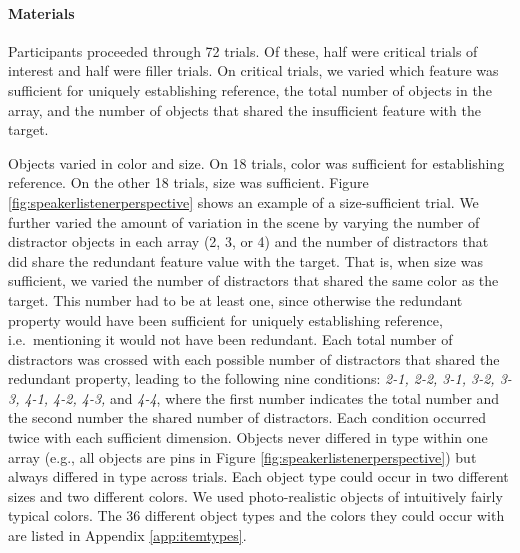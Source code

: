 \documentclass[11pt]{article}
\newcommand{\figref}[1]{Figure \ref{#1}}
\newcommand{\appref}[1]{Appendix \ref{#1}}
\begin{document}



\paragraph{Materials}

Participants proceeded through 72 trials. Of these, half were critical trials of interest and half were filler trials. On critical trials, we varied which feature was sufficient for uniquely establishing reference, the total number of objects in the array, and  the number of objects that shared the insufficient feature with the target. 

Objects varied in color and size. On 18 trials, color was sufficient for establishing reference. On the other 18 trials, size was sufficient. \figref{fig:speakerlistenerperspective} shows an example of a size-sufficient trial. We further varied the amount of variation in the scene by varying the number of distractor objects in each array (2, 3, or  4) and the number of distractors that did share the redundant feature value with the target. That is, when size was sufficient, we varied the number of distractors that shared the same color as the target. This number had to be at least one, since otherwise the redundant property would have been sufficient for uniquely establishing reference, i.e.~mentioning it would not have been redundant. Each total number of distractors was crossed with each possible number of distractors that shared the redundant property, leading to the following nine conditions: \emph{2-1, 2-2, 3-1, 3-2, 3-3, 4-1, 4-2, 4-3,} and \emph{4-4}, where the first number indicates the total number and the second number the shared number of distractors. Each condition occurred twice with each sufficient dimension. Objects never differed in type within one array (e.g., all objects are pins in \figref{fig:speakerlistenerperspective}) but always differed in type across trials. Each object type could occur in two different sizes and two different colors. We used photo-realistic objects of intuitively fairly typical colors. The 36 different object types and the colors they could occur with are listed in \appref{app:itemtypes}. 
\end{document}
